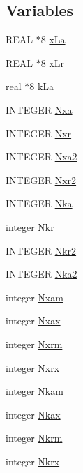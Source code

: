 \subsection*{Variables}
\begin{DoxyCompactItemize}
\item 
REAL $\ast$8 \hyperlink{namespacemesh_a7b0412308700e4488efc480ace9412b8}{xLa}
\item 
REAL $\ast$8 \hyperlink{namespacemesh_a4ad69b5cc7ea5c0bd0f1f8d39fc3f604}{xLr}
\item 
real $\ast$8 \hyperlink{namespacemesh_a9b60e77e26ab439594233774c928b35c}{kLa}
\item 
INTEGER \hyperlink{namespacemesh_ae1fae2c81e5dc8a2e00f92d4ccb24444}{Nxa}
\item 
INTEGER \hyperlink{namespacemesh_a4fae0f9e86bfdcb8fec5dc0aefd8fe71}{Nxr}
\item 
INTEGER \hyperlink{namespacemesh_a632597390bacfaae4c10d8cb907b2aec}{Nxa2}
\item 
INTEGER \hyperlink{namespacemesh_a7838433bd66eb8c9d5155928904d9a5a}{Nxr2}
\item 
INTEGER \hyperlink{namespacemesh_ab0bd6c4de110f0158d8a3aedd0be3907}{Nka}
\item 
integer \hyperlink{namespacemesh_a1d27552200f5f3bf302bcbd55bb2ccf5}{Nkr}
\item 
INTEGER \hyperlink{namespacemesh_a55a4e9bc46503b5f1fddde6e621a0b86}{Nkr2}
\item 
INTEGER \hyperlink{namespacemesh_abad69d3716a915fa710b7ba198f90f1b}{Nka2}
\item 
integer \hyperlink{namespacemesh_abe9e186636ba22271b7b4550522dceaf}{Nxam}
\item 
integer \hyperlink{namespacemesh_a258a6753e659f5aad4d77626f82c674c}{Nxax}
\item 
integer \hyperlink{namespacemesh_a3dc98a3a965cb38fc45c4b7801f0f3d2}{Nxrm}
\item 
integer \hyperlink{namespacemesh_a3836bb9dd0f99e784aecf5ffac36418a}{Nxrx}
\item 
integer \hyperlink{namespacemesh_a910970a3de4d93dbe22c5990a246c360}{Nkam}
\item 
integer \hyperlink{namespacemesh_a29b4b004a2f1961e2ad6ea8faf2bc447}{Nkax}
\item 
integer \hyperlink{namespacemesh_ac39a727e6167a944fb3c7997bfd11de4}{Nkrm}
\item 
integer \hyperlink{namespacemesh_a1750b1e7febac49c12606a9cbf2c4ac2}{Nkrx}
\item 

\end{DoxyCompactItemize}
